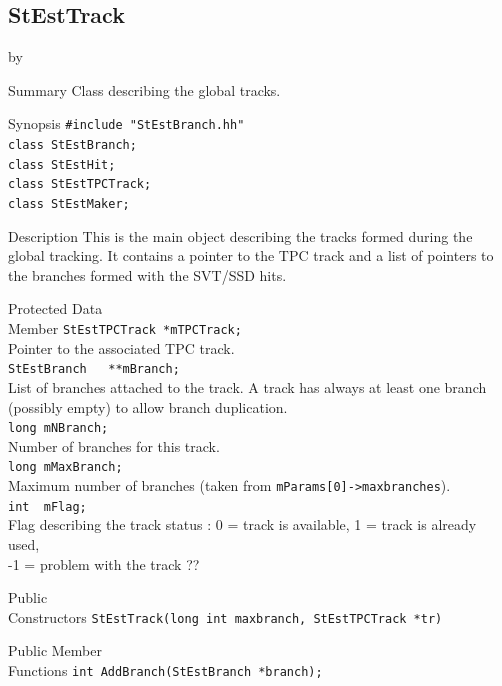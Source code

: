 \documentclass[twoside]{article}
\newcommand{\entrylabel}[1]{\mbox{\textbf{{#1}}}\hfil}%
\newenvironment{entry}
{\begin{list}{}%
    {\renewcommand{\makelabel}{\entrylabel}%
     \setlength{\labelwidth}{90pt}%
     \setlength{\leftmargin}{\labelwidth}
     \advance\leftmargin by \labelsep%
      }%
    }%
  {\end{list}}
\newcommand{\Entrylabel}[1]%
{\raisebox{0pt}[1ex][0pt]{\makebox[\labelwidth][l]%
    {\parbox[t]{\labelwidth}{\hspace{0pt}\textbf{{#1}}}}}}
\newenvironment{Entry}%
{\renewcommand{\entrylabel}{\Entrylabel}\begin{entry}}%
  {\end{entry}}
\begin{document}
\subsection{StEstTrack}
\label{sec:StestTrackq}
\begin{Entry}
\item[Summary]
Class describing the global tracks.\\ 
\item[Synopsis]
    \verb+#include "StEstBranch.hh"+\\
    \verb+class StEstBranch;+\\
    \verb+class StEstHit;+\\
    \verb+class StEstTPCTrack;+\\
    \verb+class StEstMaker;+\\
\item[Description]
    This is the main object describing the tracks formed during the global tracking. It contains a pointer to the TPC track and a list of pointers to the branches formed with the SVT/SSD hits.\\
\item[Protected Data\\ Member]
	\verb+StEstTPCTrack *mTPCTrack;+\\
	Pointer to the associated TPC track.\\
	\verb+StEstBranch   **mBranch;+\\
	List of branches attached to the track. A track has always at least one branch (possibly empty) to allow branch duplication.\\
	\verb+long mNBranch;+\\ 
	Number of branches for this track.\\
	\verb+long mMaxBranch;+\\
	Maximum number of branches (taken from \verb+mParams[0]->maxbranches+).\\
	\verb+int  mFlag;+\\
	Flag describing the track status : 0 = track is available, 1 = track is already used, \\
	-1 = problem with the track ??\\
\item[Public\\ Constructors]
	\verb+StEstTrack(long int maxbranch, StEstTPCTrack *tr)+\\
\item[Public Member\\ Functions]
	\verb+int AddBranch(StEstBranch *branch);+\\

\end{Entry}
\end{document}
